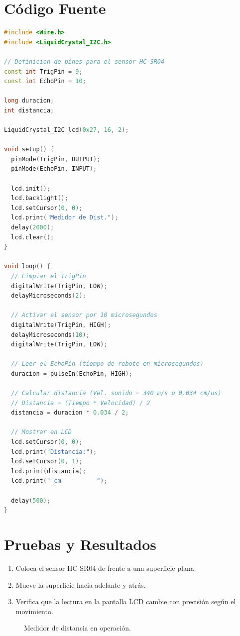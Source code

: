 \documentclass[12pt,a4paper]{article}
\begin{document}
\section{Código Fuente}
\begin{lstlisting}[language=C++]
#include <Wire.h>
#include <LiquidCrystal_I2C.h>

// Definicion de pines para el sensor HC-SR04
const int TrigPin = 9;
const int EchoPin = 10;

long duracion;
int distancia;

LiquidCrystal_I2C lcd(0x27, 16, 2);

void setup() {
  pinMode(TrigPin, OUTPUT);
  pinMode(EchoPin, INPUT);
  
  lcd.init();
  lcd.backlight();
  lcd.setCursor(0, 0);
  lcd.print("Medidor de Dist.");
  delay(2000);
  lcd.clear();
}

void loop() {
  // Limpiar el TrigPin
  digitalWrite(TrigPin, LOW);
  delayMicroseconds(2);
  
  // Activar el sensor por 10 microsegundos
  digitalWrite(TrigPin, HIGH);
  delayMicroseconds(10);
  digitalWrite(TrigPin, LOW);
  
  // Leer el EchoPin (tiempo de rebote en microsegundos)
  duracion = pulseIn(EchoPin, HIGH);
  
  // Calcular distancia (Vel. sonido = 340 m/s o 0.034 cm/us)
  // Distancia = (Tiempo * Velocidad) / 2
  distancia = duracion * 0.034 / 2;
  
  // Mostrar en LCD
  lcd.setCursor(0, 0);
  lcd.print("Distancia:");
  lcd.setCursor(0, 1);
  lcd.print(distancia);
  lcd.print(" cm          ");
  
  delay(500);
}
\end{lstlisting}

\section{Pruebas y Resultados}
\begin{enumerate}
    \item Coloca el sensor HC-SR04 de frente a una superficie plana.
    \item Mueve la superficie hacia adelante y atrás.
    \item Verifica que la lectura en la pantalla LCD cambie con precisión según el movimiento.
\end{enumerate}

\begin{figure}[h]
    \centering
    \setlength{\fboxsep}{10pt}
    \setlength{\fboxrule}{1pt}
    \caption{Medidor de distancia en operación.}
\end{figure}
\end{document}
